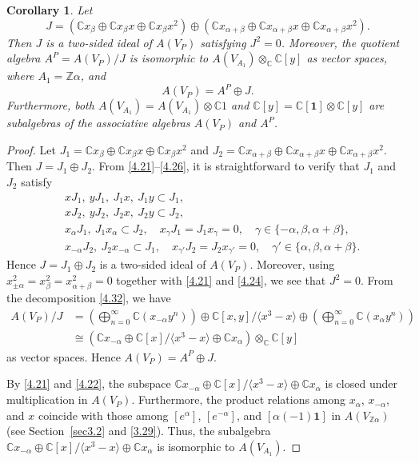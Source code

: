 \documentclass[12pt,a4paper,reqno]{amsart}
\numberwithin{equation}{section}
\numberwithin{equation}{section}
\newtheorem{coro}[thm]{Corollary}
\theoremstyle{definition}
\newcommand{\Z}{\mathbb{Z}}
\def \C {\mathbb{C}}
\def \al{\alpha}
\def \ga {\gamma}
\def \b {\beta}
\def \op {\oplus}
\def \vac {\mathbf{1}}
\def\<{\langle}
\def\>{\rangle}
\begin{document}
	\begin{coro}\label{coro4.11}
		Let 
		\[
		J=\left(\C x_\b\op \C x_\b x\op\C x_\b x^2\right)\op \left(\C x_{\al+\b} \op \C x_{\al+\b}x\op\C x_{\al+\b}x^2\right).
		\]
		Then $J$ is a two-sided ideal of $A(V_P)$ satisfying $J^2=0$. Moreover, the quotient algebra $A^P=A(V_P)/J$ is isomorphic to $A(V_{A_1})\otimes_{\C} \C[y]$ as vector spaces, where $A_1=\Z\al$, and 
		\[
		A(V_P)=A^P\op J.
		\]
		Furthermore, both $A(V_{A_1})=A(V_{A_1})\otimes \C 1$ and $\C[y]=\C [\vac]\otimes \C[y]$ are subalgebras of the associative algebras $A(V_P)$ and $A^P$. 
	\end{coro}
	
	\begin{proof}
		Let $J_1=\C x_\b\op \C x_\b x\op\C x_\b x^2$ and $J_2=\C x_{\al+\b} \op \C x_{\al+\b}x\op\C x_{\al+\b}x^2$. Then $J=J_1\op J_2$. From \eqref{4.21}--\eqref{4.26}, it is straightforward to verify that $J_1$ and $J_2$ satisfy
		\begin{align*}
			&	xJ_1,\ yJ_1,\ J_1x,\ J_1y \subset J_1,\\
			&	xJ_2,\ yJ_2,\ J_2x,\ J_2y \subset J_2,\\
			&	x_\al J_1,\ J_1 x_\al\subset J_2,\quad x_\ga J_1=J_1x_\ga=0,\quad \ga\in\{-\al,\b,\al+\b\},\\
			&	x_{-\al} J_2,\ J_2 x_{-\al}\subset J_1,\quad x_{\ga'} J_2=J_2x_{\ga'}=0,\quad \ga'\in\{\al,\b,\al+\b\}.
		\end{align*}
		Hence $J=J_1\op J_2$ is a two-sided ideal of $A(V_P)$. Moreover, using $x_{\pm\al}^2=x_\b^2=x_{\al+\b}^2=0$ together with \eqref{4.21} and \eqref{4.24}, we see that $J^2=0$. From the decomposition \eqref{4.32}, we have 
		\begin{align*}
			A(V_P)/J&=\left(\bigoplus_{n=0}^\infty \C(x_{-\al}y^n)\right)\op \C[x,y]/\<x^3-x\>\op \left(\bigoplus_{n=0}^\infty \C (x_{\al}y^n) \right)\\
			&\cong \left( \C x_{-\al}\op \C[x]/\<x^3-x\>\op \C x_\al\right)\otimes_\C \C [y]
		\end{align*}
		as vector spaces. Hence $A(V_P)=A^P\op J$. 
		
		By \eqref{4.21} and \eqref{4.22}, the subspace $\C x_{-\al}\op \C[x]/\<x^3-x\>\op \C x_\al$ is closed under multiplication in $A(V_P)$. Furthermore, the product relations among $x_{ \al}$, $x_{-\al}$, and $x$ coincide with those among $[e^\al]$, $[e^{-\al}]$, and $[\al(-1)\vac]$ in $A(V_{\Z \al})$ (see Section~\ref{sec3.2} and \eqref{3.29}). Thus, the subalgebra $\C x_{-\al}\op \C[x]/\<x^3-x\>\op \C x_\al$ is isomorphic to $A(V_{A_1})$. 
	\end{proof}
	
\end{document}
